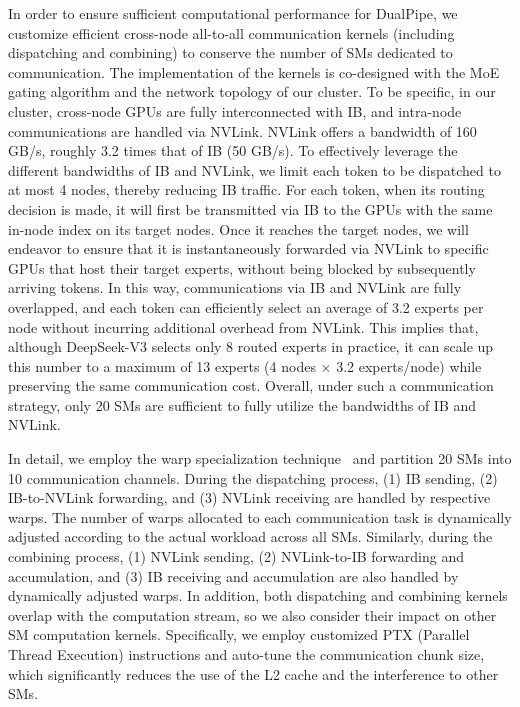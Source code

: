 \documentclass[11pt, a4paper, logo, copyright, nonumbering]{deepseek}
\newcommand{\dsviii}{DeepSeek-V3}
\begin{document}
\begin{CJK*}{UTF8}{gbsn}
In order to ensure sufficient computational performance for DualPipe, we customize efficient cross-node all-to-all communication kernels (including dispatching and combining) to conserve the number of SMs dedicated to communication.
The implementation of the kernels is co-designed with the MoE gating algorithm and the network topology of our cluster.
To be specific, in our cluster, cross-node GPUs are fully interconnected with IB, and intra-node communications are handled via NVLink.
NVLink offers a bandwidth of 160 GB/s, roughly 3.2 times that of IB (50 GB/s). 
To effectively leverage the different bandwidths of IB and NVLink, we limit each token to be dispatched to at most 4 nodes, thereby reducing IB traffic.
For each token, when its routing decision is made, it will first be transmitted via IB to the GPUs with the same in-node index on its target nodes. 
Once it reaches the target nodes, we will endeavor to ensure that it is instantaneously forwarded via NVLink to specific GPUs that host their target experts, without being blocked by subsequently arriving tokens.
In this way, communications via IB and NVLink are fully overlapped, and each token can efficiently select an average of 3.2 experts per node without incurring additional overhead from NVLink.
This implies that, although \dsviii{} selects only 8 routed experts in practice, it can scale up this number to a maximum of 13 experts (4 nodes $\times$ 3.2 experts/node) while preserving the same communication cost.
Overall, under such a communication strategy, only 20 SMs are sufficient to fully utilize the bandwidths of IB and NVLink.

In detail, we employ the warp specialization technique~\citep{warp-spec} and partition 20 SMs into 10 communication channels.
During the dispatching process, (1) IB sending, (2) IB-to-NVLink forwarding, and (3) NVLink receiving are handled by respective warps. 
The number of warps allocated to each communication task is dynamically adjusted according to the actual workload across all SMs. 
Similarly, during the combining process, (1) NVLink sending, (2) NVLink-to-IB forwarding and accumulation, and (3) IB receiving and accumulation are also handled by dynamically adjusted warps. 
In addition, both dispatching and combining kernels overlap with the computation stream, so we also consider their impact on other SM computation kernels. 
Specifically, we employ customized PTX (Parallel Thread Execution) instructions and auto-tune the communication chunk size, which significantly reduces the use of the L2 cache and the interference to other SMs. 


\end{CJK*}
\end{document}
